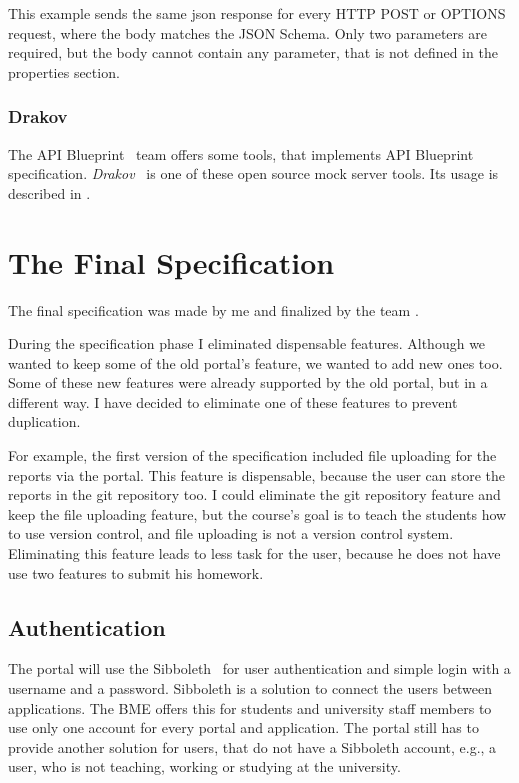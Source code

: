 This example sends the same json response for every HTTP POST or OPTIONS request, where the body matches the JSON Schema. Only two parameters are required, but the body cannot contain any parameter, that is not defined in the properties section.

\subsubsection{Drakov}

The API Blueprint~\cite{api-blueprint} team offers some tools, that implements API Blueprint specification. \emph{Drakov}~\cite{drakov} is one of these open source mock server tools. Its usage is described in .




\section{The Final Specification} \label{final-spec}
The final specification was made by me and finalized by the team .

During the specification phase I eliminated dispensable features. Although we wanted to keep some of the old portal's feature, we wanted to add new ones too. Some of these new features were already supported by the old portal, but in a different way. I have decided to eliminate one of these features to prevent duplication.

For example, the first version of the specification included file uploading for the reports via the portal. This feature is dispensable, because the user can store the reports in the git repository too. I could eliminate the git repository feature and keep the file uploading feature, but the course's goal is to teach the students how to use version control, and file uploading is not a version control system. Eliminating this feature leads to less task for the user, because he does not have use two features to submit his homework.

\subsection{Authentication}
The portal will use the Sibboleth~\cite{sibboleth} for user authentication and simple login with a username and a password. Sibboleth is a solution to connect the users between applications. The BME offers this for students and university staff members to use only one account for every portal and application. The portal still has to provide another solution for users, that do not have a Sibboleth account, e.g., a user, who is not teaching, working or studying at the university.

